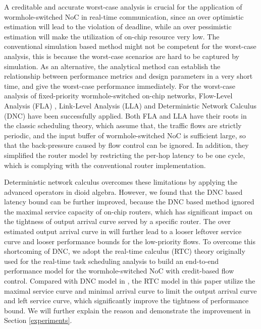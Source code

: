 \documentclass[10pt,journal]{IEEEtran}
\begin{document}
A creditable and accurate worst-case analysis is crucial for the application of wormhole-switched NoC in real-time communication, since an over optimistic estimation will lead to the violation of deadline, while an over pessimistic estimation will make the utilization of on-chip resource very low. The conventional simulation based method might not be competent for the worst-case analysis, this is because the worst-case scenarios are hard to be captured by simulation. As an alternative, the analytical method can establish the relationship between performance metrics and design parameters in a very short time, and give the worst-case performance immediately. For the worst-case analysis of fixed-priority wormhole-switched on-chip networks, Flow-Level Analysis (FLA) \cite{Shi:2008:RCA:1397757.1397996}, Link-Level Analysis (LLA) \cite{73}\cite{189} and Deterministic Network Calculus (DNC) \cite{Qian489900} have been successfully applied. Both FLA and LLA have their roots in the classic scheduling theory, which assume that, the traffic flows are strictly periodic, and the input buffer of wormhole-switched NoC is sufficient large, so that the back-pressure caused by flow control can be ignored. In addition, they simplified the router model by restricting the per-hop latency to be one cycle, which is complying with the conventional router implementation.

Deterministic network calculus overcomes these limitations by applying the advanced operators in dioid algebra. However, we found that the DNC based latency bound can be further improved, because the DNC based method \cite{Qian489900} ignored the maximal service capacity of on-chip routers, which has significant impact on the tightness of output arrival curve served by a specific router. The over estimated output arrival curve in \cite{Qian489900} will further lead to a looser leftover service curve and looser performance bounds for the low-priority flows. To overcome this shortcoming of DNC, we adopt the real-time calculus (RTC) theory \cite{1253607} originally used for the real-time task scheduling analysis to build an end-to-end performance model for the wormhole-switched NoC with credit-based flow control. Compared with DNC model in \cite{Qian489900}, the RTC model in this paper utilize the maximal service curve and minimal arrival curve to limit the output arrival curve and left service curve, which significantly improve the tightness of performance bound. We will further explain the reason and demonstrate the improvement in Section \ref{experiments}.
\end{document}
